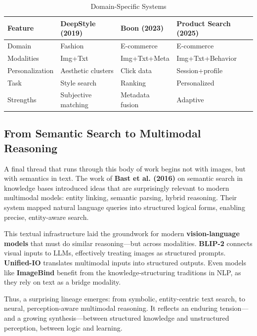 \documentclass[conference]{IEEEtran}
\begin{document}
\begin{table}[ht]
\centering
\caption{Domain-Specific Systems}
\label{tab:domain}
\small
\setlength{\tabcolsep}{4pt}
\begin{tabularx}{\columnwidth}{@{}>{\raggedright\arraybackslash}X>{\raggedright\arraybackslash}X>{\raggedright\arraybackslash}X>{\raggedright\arraybackslash}X@{}}
\toprule
\textbf{Feature} & \textbf{DeepStyle (2019)} & \textbf{Boon (2023)} & \textbf{Product Search (2025)} \\
\midrule
Domain & Fashion & E-commerce & E-commerce \\
Modalities & Img+Txt & Img+Txt+Meta & Img+Txt+Behavior \\
Personalization & Aesthetic clusters & Click data & Session+profile \\
Task & Style search & Ranking & Personalized \\
Strengths & Subjective matching & Metadata fusion & Adaptive \\
\bottomrule
\end{tabularx}
\end{table}

\subsection{From Semantic Search to Multimodal Reasoning}

A final thread that runs through this body of work begins not with images, but with semantics in text. The work of \textbf{Bast et al. (2016)} on semantic search in knowledge bases introduced ideas that are surprisingly relevant to modern multimodal models: entity linking, semantic parsing, hybrid reasoning. Their system mapped natural language queries into structured logical forms, enabling precise, entity-aware search.

This textual infrastructure laid the groundwork for modern \textbf{vision-language models} that must do similar reasoning—but across modalities. \textbf{BLIP-2} connects visual inputs to LLMs, effectively treating images as structured prompts. \textbf{Unified-IO} translates multimodal inputs into structured outputs. Even models like \textbf{ImageBind} benefit from the knowledge-structuring traditions in NLP, as they rely on text as a bridge modality.

Thus, a surprising lineage emerges: from symbolic, entity-centric text search, to neural, perception-aware multimodal reasoning. It reflects an enduring tension—and a growing synthesis—between structured knowledge and unstructured perception, between logic and learning.
\end{document}
